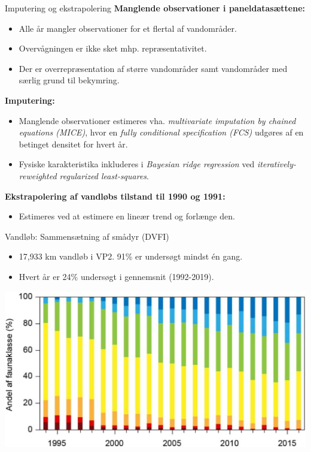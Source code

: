 \begin{frame}{Imputering og ekstrapolering}
  \textbf{Manglende observationer i paneldatasættene:}
  \begin{itemize}
    \item Alle år mangler observationer for et flertal af vandområder.
    \item Overvågningen er ikke sket mhp. repræsentativitet.
    \item Der er overrepræsentation af større vandområder samt vandområder med særlig grund til bekymring.
  \end{itemize}
  \textbf{Imputering:}
  \begin{itemize}
    \item Manglende observationer estimeres vha. \textit{multivariate imputation by chained equations (MICE)}, hvor en \textit{fully conditional specification (FCS)} udgøres af en betinget densitet for hvert år.
    \item Fysiske karakteristika inkluderes i \textit{Bayesian ridge regression} ved \textit{iteratively-reweighted regularized least-squares}.
  \end{itemize}
  \textbf{Ekstrapolering af vandløbs tilstand til 1990 og 1991:}
  \begin{itemize}
    \item Estimeres ved at estimere en lineær trend og forlænge den.
  \end{itemize}
\end{frame}

\begin{frame}{Vandløb: Sammensætning af smådyr (DVFI)}
  \begin{itemize}
    \item 17,933 km vandløb i VP2. 91\% er undersøgt mindst én gang.
    \item Hvert år er 24\% undersøgt i gennemsnit (1992-2019).
  \end{itemize}
  \includegraphics[width=\textwidth]{figures/DVFI}
\end{frame}

